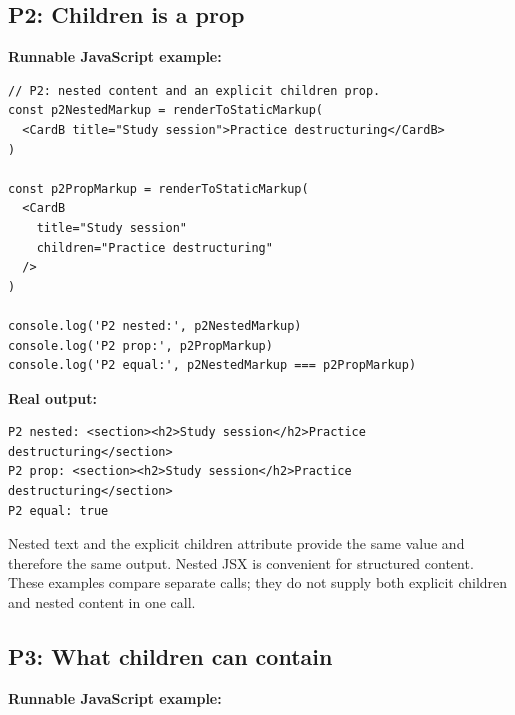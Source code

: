 \documentclass[10pt,a4paper]{article}
\begin{document}
\subsection{P2: Children is a prop}

\textbf{Runnable JavaScript example:}

\begin{lstlisting}[language=GuideJS]
// P2: nested content and an explicit children prop.
const p2NestedMarkup = renderToStaticMarkup(
  <CardB title="Study session">Practice destructuring</CardB>
)

const p2PropMarkup = renderToStaticMarkup(
  <CardB
    title="Study session"
    children="Practice destructuring"
  />
)

console.log('P2 nested:', p2NestedMarkup)
console.log('P2 prop:', p2PropMarkup)
console.log('P2 equal:', p2NestedMarkup === p2PropMarkup)
\end{lstlisting}


\textbf{Real output:}

\begin{lstlisting}[language={}]
P2 nested: <section><h2>Study session</h2>Practice destructuring</section>
P2 prop: <section><h2>Study session</h2>Practice destructuring</section>
P2 equal: true
\end{lstlisting}

Nested text and the explicit children attribute provide the same value and therefore the same output. Nested JSX is convenient for structured content. These examples compare separate calls; they do not supply both explicit children and nested content in one call.

\subsection{P3: What children can contain}

\textbf{Runnable JavaScript example:}
\end{document}
